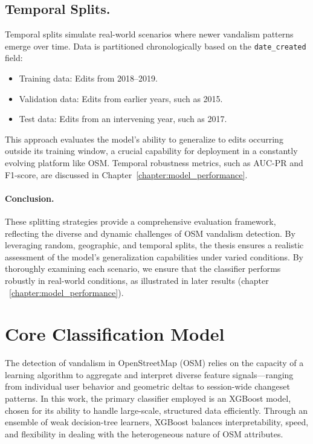 \documentclass[
    13pt, %
    a4paper, %
    DIV14, %
    listof=totoc, %
    bibliography=totoc, %
    index=totoc, %
    headsepline
]{scrreprt}
\begin{document}
\subsection{Temporal Splits.}
Temporal splits simulate real-world scenarios where newer vandalism patterns emerge over time. Data is partitioned chronologically based on the \texttt{date\_created} field:
\begin{itemize}
    \item Training data: Edits from 2018--2019.
    \item Validation data: Edits from earlier years, such as 2015.
    \item Test data: Edits from an intervening year, such as 2017.
\end{itemize}

This approach evaluates the model’s ability to generalize to edits occurring outside its training window, a crucial capability for deployment in a constantly evolving platform like OSM. Temporal robustness metrics, such as AUC-PR and F1-score, are discussed in Chapter~\ref{chapter:model_performance}.

\paragraph{Conclusion.}
These splitting strategies provide a comprehensive evaluation framework, reflecting the diverse and dynamic challenges of OSM vandalism detection. By leveraging random, geographic, and temporal splits, the thesis ensures a realistic assessment of the model's generalization capabilities under varied conditions. By thoroughly examining each scenario, we ensure that the classifier performs robustly in real-world conditions, as illustrated in later results (chapter ~\ref{chapter:model_performance}).


\section{Core Classification Model}
\label{sec:core_classification_model}

The detection of vandalism in OpenStreetMap (OSM) relies on the capacity of a learning algorithm to aggregate and interpret diverse feature signals—ranging from individual user behavior and geometric deltas to session-wide changeset patterns. In this work, the primary classifier employed is an XGBoost model, chosen for its ability to handle large-scale, structured data efficiently. Through an ensemble of weak decision-tree learners, XGBoost balances interpretability, speed, and flexibility in dealing with the heterogeneous nature of OSM attributes.
\end{document}
